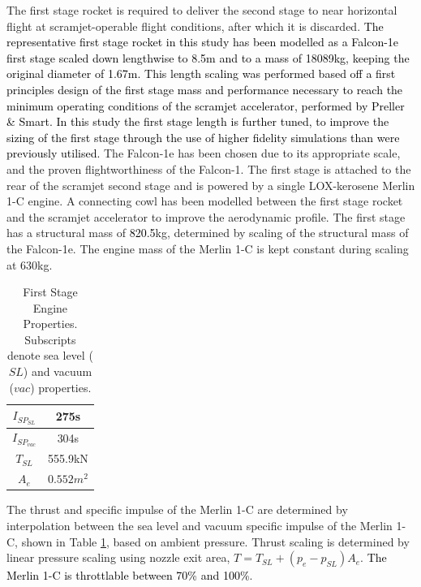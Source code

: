 The first stage rocket is required to deliver the second stage to near horizontal flight at scramjet-operable flight conditions,
after which it is discarded. 
\textcolor{black}{The representative first stage rocket in this study has been  modelled as a Falcon-1e first stage scaled down
lengthwise to 8.5m and to a mass of 18089kg, keeping the original diameter of 1.67m\cite{Vehicle2008}. This length scaling was performed based off a first principles design of the first stage mass and performance necessary to reach the minimum operating conditions of the scramjet accelerator, performed by Preller \& Smart\cite{Preller2017b}. In this study the first stage length is further tuned, to improve the sizing of the first stage through the use of higher fidelity simulations than were previously utilised.}
The Falcon-1e has been chosen due to its appropriate scale, and the proven flightworthiness of the Falcon-1. 
 The first stage is attached to the rear of the scramjet
second stage and is powered by a single LOX-kerosene Merlin 1-C engine. A connecting cowl has been modelled between the first stage rocket and the scramjet accelerator to improve the aerodynamic profile.  The first stage has a structural mass of
\textcolor{black}{820.5}kg, determined by scaling of the structural mass of the Falcon-1e. The engine mass of the Merlin 1-C is kept constant during scaling at 630kg\cite{Wade2017}.

\begin{table}[!h]
	\centering
	\begin{tabular}{|c|c|}
		\hline  $I_{SP_{SL}}$ & 275s \\ 
		\hline  $I_{SP_{vac}}$ & 304s\\ 
		\hline  $T_{SL}$ & 555.9kN \\ 
		\hline  $A_{e}$ & $0.552m^2$ \\ 
		\hline 
	\end{tabular} 
	\caption{First Stage Engine Properties\cite{Wade2017}. Subscripts denote sea level ($SL$) and vacuum ($vac$) properties.}
	\label{tab:1stStageEngine}
\end{table}
The thrust and specific impulse of the Merlin 1-C are determined by interpolation between the sea level and vacuum specific impulse of the Merlin 1-C, shown in Table \ref{tab:1stStageEngine}, based on ambient pressure. Thrust scaling is determined by linear pressure scaling using nozzle exit area, $T = T_{SL} + (p_e - p_{SL})A_e$. 
 \textcolor{black}{The Merlin 1-C is throttlable between 70\% and 100\%\cite{Norris2011}}.




